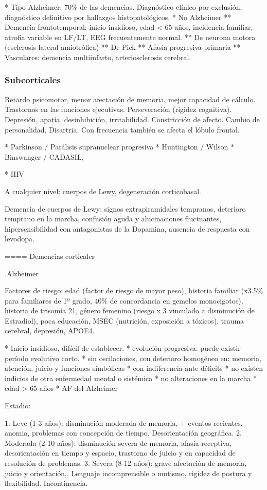 \documentclass{scrbook}
\begin{document}
* Tipo Alzheimer: 70\% de las demencias. Diagnóstico clínico por exclusión, diagnóstico definitivo por hallazgos histopatológicos.
* No Alzheimer
** Demencia frontotemporal: inicio insidioso, edad < 65 años, incidencia familiar, atrofia variable en LF/LT, EEG frecuentemente normal.
** De neurona motora (esclerosis lateral amiotrófica)
** De Pick
** Afasia progresiva primaria
** Vasculares: demencia multiinfarto, arteriosclerosis cerebral.

\subsubsection*{Subcorticales}
Retardo psicomotor, menor afectación de memoria, mejor capacidad de cálculo. Trastornos en las funciones ejecutivas. Perseveración (rigidez cognitiva). Depresión, apatía, desinhibición, irritabilidad. Constricción de afecto. Cambio de personalidad. Disartria. Con frecuencia también se afecta el lóbulo frontal.

* Parkinson / Parálisis supranuclear progresiva
* Huntington / Wilson
* Binswanger / CADASIL,

* HIV

A cualquier nivel: cuerpos de Lewy, degeneración corticobasal.

Demencia de cuerpos de Lewy: signos extrapiramidales tempranos, deterioro temprano en la marcha, confusión aguda y alucinaciones fluctuantes, hipersensibilidad con antagonistas de la Dopamina, ausencia de respuesta con levodopa.

==== Demencias corticales

.Alzheimer

Factores de riesgo: edad (factor de riesgo de mayor peso), historia familiar (x3.5\% para familiares de 1º grado, 40\% de concordancia en gemelos monocigotos), historia de trisomía 21, género femenino (riesgo x 3 vinculado a disminución de Estradiol), poca educación, MSEC (nutrición, exposición a tóxicos), trauma cerebral, depresión, APOE4.

* Inicio insidioso, difícil de establecer.
* evolución progresiva: puede existir período evolutivo corto.
* sin oscilaciones, con deterioro homogéneo en: memoria, atención, juicio y funciones simbólicas
* con indiferencia ante déficits
* no existen indicios de otra enfermedad mental o sistémica
* no alteraciones en la marcha
* edad > 65 años
* AF del Alzheimer

Estadio:

1. Leve (1-3 años): disminución moderada de memoria, + eventos recientes, anomia, problemas con concepción de tiempo. Desorientación geográfica.
2. Moderada (2-10 años): disminución severa de memoria, afasia receptiva, desorientación en tiempo y espacio, trastorno de juicio y en capacidad de resolución de problemas.
3. Severa (8-12 años): grave afectación de memoria, juicio y orientación,. Lenguaje incomprensible o mutismo, rigidez de postura y flexibilidad. Incontinencia.
\end{document}
